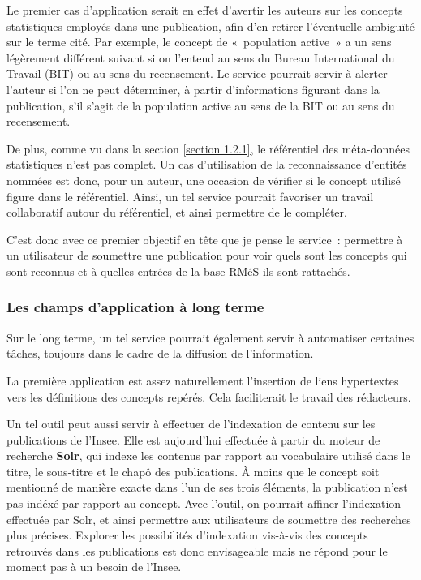 Le premier cas d'application serait en effet d'avertir les auteurs sur les concepts statistiques employés dans une publication, afin d'en retirer l'éventuelle ambiguïté sur le terme cité. Par exemple, le concept de «~population active~» a un sens légèrement différent suivant si on l'entend au sens du Bureau International du Travail (BIT) ou au sens du recensement. Le service pourrait servir à alerter l'auteur si l'on ne peut déterminer, à partir d'informations figurant dans la publication, s'il s'agit de la population active au sens de la BIT ou au sens du recensement.
\newline

De plus, comme vu dans la section \ref{section 1.2.1}, le référentiel des méta-données statistiques n'est pas complet. Un cas d'utilisation de la reconnaissance d'entités nommées est donc, pour un auteur, une occasion de vérifier si le concept utilisé figure dans le référentiel. Ainsi, un tel service pourrait favoriser un travail collaboratif autour du référentiel, et ainsi permettre de le compléter.
\newline

C'est donc avec ce premier objectif en tête que je pense le service~: permettre à un utilisateur de soumettre une publication pour voir quels sont les concepts qui sont reconnus et à quelles entrées de la base RMéS ils sont rattachés.
\label{section 2.1.3}

\subsubsection{Les champs d'application à long terme}
Sur le long terme, un tel service pourrait également servir à automatiser certaines tâches, toujours dans le cadre de la diffusion de l'information.
\newline

La première application est assez naturellement l'insertion de liens hypertextes vers les définitions des concepts repérés. Cela faciliterait le travail des rédacteurs. 
\newline

Un tel outil peut aussi servir à effectuer de l'indexation de contenu sur les publications de l'Insee. Elle est aujourd'hui effectuée à partir du moteur de recherche \textbf{Solr}, qui indexe les contenus par rapport au vocabulaire utilisé dans le titre, le sous-titre et le chapô des publications. À moins que le concept soit mentionné de manière exacte dans l'un de ses trois éléments, la publication n'est pas indéxé par rapport au concept. Avec l'outil, on pourrait affiner l'indexation effectuée par Solr, et ainsi permettre aux utilisateurs de soumettre des recherches plus précises. Explorer les possibilités d'indexation vis-à-vis des concepts retrouvés dans les publications est donc envisageable mais ne répond pour le moment pas à un besoin de l'Insee.
\newline

